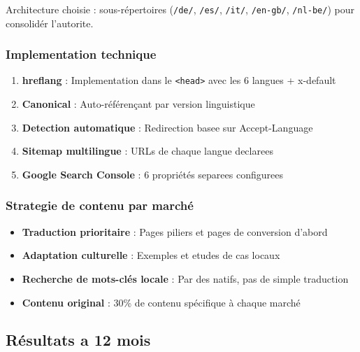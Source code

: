 \documentclass[12pt,a4paper,twoside]{report}
\begin{document}
Architecture choisie : sous-répertoires (\texttt{/de/}, \texttt{/es/}, \texttt{/it/}, \texttt{/en-gb/}, \texttt{/nl-be/}) pour consolidér l'autorite.

\subsubsection{Implementation technique}
\begin{enumerate}
    \item \textbf{hreflang} : Implementation dans le \texttt{<head>} avec les 6 langues + x-default
    \item \textbf{Canonical} : Auto-référençant par version linguistique
    \item \textbf{Detection automatique} : Redirection basee sur Accept-Language
    \item \textbf{Sitemap multilingue} : URLs de chaque langue declarees
    \item \textbf{Google Search Console} : 6 propriétés separees configurees
\end{enumerate}

\subsubsection{Strategie de contenu par marché}
\begin{itemize}
    \item \textbf{Traduction prioritaire} : Pages piliers et pages de conversion d'abord
    \item \textbf{Adaptation culturelle} : Exemples et etudes de cas locaux
    \item \textbf{Recherche de mots-clés locale} : Par des natifs, pas de simple traduction
    \item \textbf{Contenu original} : 30\% de contenu spécifique à chaque marché
\end{itemize}

\subsection{Résultats a 12 mois}
\end{document}
